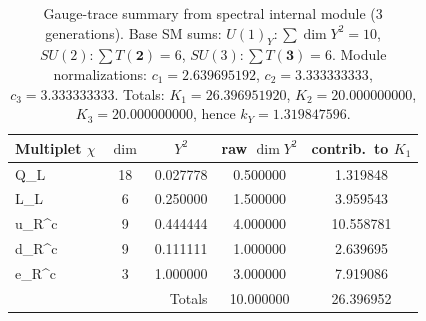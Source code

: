 \begin{table}[h!]
\centering
\caption{Gauge-trace summary from spectral internal module (3 generations).
Base SM sums: $U(1)_Y:\sum \dim Y^2 = 10$, $SU(2):\sum T(\mathbf{2}) = 6$, $SU(3):\sum T(\mathbf{3}) = 6$.
Module normalizations: $c_1=2.639695192$, $c_2=3.333333333$, $c_3=3.333333333$. Totals: $K_1=26.396951920$, $K_2=20.000000000$, $K_3=20.000000000$, hence $k_Y=1.319847596$.}
\label{tab:ULT-traces}
\begin{tabular}{lcccc}
\hline\hline
Multiplet $\chi$ & $\dim$ & $Y^2$ & raw $\dim Y^2$ & contrib.\ to $K_1$ \\
\hline
Q_L & 18 & 0.027778 & 0.500000 & 1.319848 \\
L_L & 6 & 0.250000 & 1.500000 & 3.959543 \\
u_R^c & 9 & 0.444444 & 4.000000 & 10.558781 \\
d_R^c & 9 & 0.111111 & 1.000000 & 2.639695 \\
e_R^c & 3 & 1.000000 & 3.000000 & 7.919086 \\
\hline
\multicolumn{3}{r}{Totals} & 10.000000 & 26.396952 \\
\hline\hline
\end{tabular}
\end{table}
